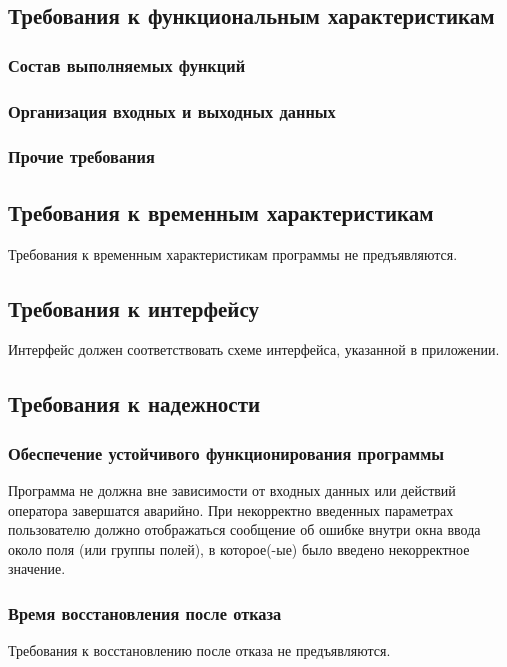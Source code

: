 

\subsection{Требования к функциональным характеристикам}
\subsubsection{Состав выполняемых функций}
\subsubsection{Организация входных и выходных данных}
\subsubsection{Прочие требования}


\subsection{Требования к временным характеристикам}
Требования к временным характеристикам программы не предъявляются.

\subsection{Требования к интерфейсу}
Интерфейс должен соответствовать схеме интерфейса, указанной в приложении.

\subsection{Требования к надежности}
\subsubsection{Обеспечение устойчивого функционирования программы}
Программа не должна вне зависимости от входных данных или действий оператора завершатся аварийно. При некорректно введенных параметрах пользователю должно отображаться сообщение об ошибке внутри окна ввода около поля (или группы полей), в которое(-ые) было введено некорректное значение.
\subsubsection{Время восстановления после отказа}
Требования к восстановлению после отказа не предъявляются.
